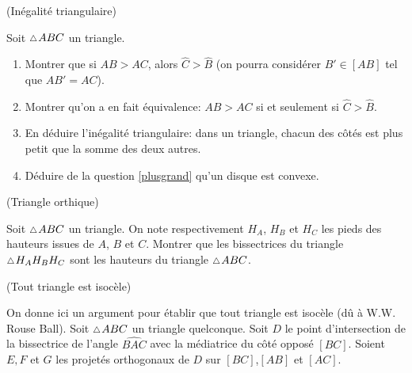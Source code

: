 \documentclass[a4paper,11pt,reqno]{amsart}
\begin{document}
\begin{exo} (Inégalité triangulaire)

  Soit $\tri ABC$ un triangle.
  \begin{enumerate}
    \item \label{plusgrand} Montrer que si $AB > AC$, alors $\widehat{C}>\widehat{B}$ (on pourra considérer $B' \in [AB]$ tel que $AB'=AC$). %
    \item Montrer qu'on a en fait équivalence: $AB>AC$ si et seulement si $\widehat{C}>\widehat{B}$.
    \item En déduire l'inégalité triangulaire: dans un triangle, chacun des côtés est plus petit que la somme des deux autres.
    \item Déduire de la question \ref{plusgrand} qu'un disque est convexe.
  \end{enumerate}
\end{exo}


\begin{exo} (Triangle orthique)

  Soit $\tri ABC$ un triangle. On note respectivement $H_A$, $H_B$ et $H_C$ les pieds des hauteurs issues de $A$, $B$ et $C$. Montrer que les bissectrices du triangle $\tri H_AH_BH_C$ sont les hauteurs du triangle $\tri ABC$.
\end{exo}

\begin{exo} (Tout triangle est isocèle)

  On donne ici un argument pour établir que tout triangle est isocèle (dû à W.W. Rouse Ball).
  Soit $\tri ABC$ un triangle quelconque. Soit $D$ le point d'intersection de la bissectrice de l'angle $\widehat{BAC}$ avec la médiatrice du côté opposé $[BC]$. Soient $E,F$ et $G$ les projetés orthogonaux de $D$ sur $[BC]$,$[AB]$ et $[AC]$.\baselineskip
\end{exo}
\end{document}
